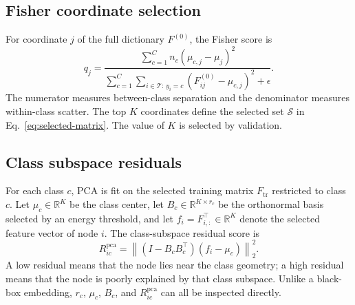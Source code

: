 \documentclass{article}
\newcommand{\Ffull}{F^{(0)}}
\newcommand{\Fsel}{F}
\newcommand{\Ftr}{F_{\mathrm{tr}}}
\newcommand{\Train}{\mathcal{T}}
\newcommand{\Sel}{\mathcal{S}}
\begin{document}
\subsection{Fisher coordinate selection}
For coordinate $j$ of the full dictionary $\Ffull$, the Fisher score is
\begin{equation}
q_j
=
\frac{\sum_{c=1}^C n_c(\mu_{c,j}-\mu_j)^2}
{\sum_{c=1}^C\sum_{i\in\Train:\,y_i=c}(\Ffull_{ij}-\mu_{c,j})^2+\epsilon}.
\label{eq:fisher}
\end{equation}
The numerator measures between-class separation and the denominator measures
within-class scatter. The top $K$ coordinates define the selected set
$\Sel$ in Eq.~\eqref{eq:selected-matrix}. The value of $K$ is selected by
validation.


\subsection{Class subspace residuals}
For each class $c$, PCA is fit on the selected training matrix $\Ftr$
restricted to class $c$. Let $\mu_c\in\mathbb{R}^{K}$ be the class center,
let $B_c\in\mathbb{R}^{K\times r_c}$ be the orthonormal basis selected by an
energy threshold, and let
$f_i=\Fsel_{i,:}^{\top}\in\mathbb{R}^{K}$ denote the selected feature vector
of node $i$. The class-subspace residual score is
\begin{equation}
R^{\mathrm{pca}}_{ic}
=
\left\|
(I-B_cB_c^\top)(f_i-\mu_c)
\right\|_2^2.
\label{eq:pcares}
\end{equation}
A low residual means that the node lies near the class geometry; a high
residual means that the node is poorly explained by that class subspace.
Unlike a black-box embedding, $r_c$, $\mu_c$, $B_c$, and
$R^{\mathrm{pca}}_{ic}$ can all be inspected directly.
\end{document}
